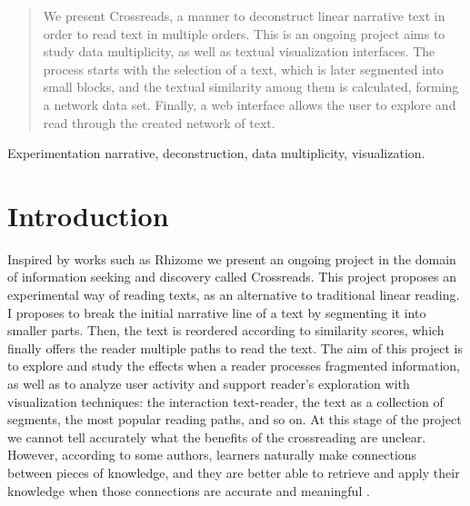 \documentclass{acm_proc_article-sp}
\begin{document}
\date{1st September 2014}

\maketitle
\begin{abstract}
We present Crossreads, a manner to deconstruct linear narrative text in order to read text in multiple orders. This is an ongoing project aims to study data multiplicity, as well as textual visualization interfaces. The
process starts with the selection of a text, which is later segmented into
small blocks, and the textual similarity among them is calculated, forming a network data set. Finally, a web interface allows the user to explore
and read through the created network of text. 
\end{abstract}

\terms Experimentation
\keywords narrative, deconstruction, data multiplicity, visualization.


\section{Introduction}

Inspired by works such as Rhizome \cite{deleuze1987introduction} we
present an ongoing project in the domain of information seeking and
discovery called Crossreads. This project proposes an experimental way
of reading texts, as an alternative to traditional linear reading. I  proposes
to break the initial narrative line of a text by segmenting it
into smaller parts. Then, the text is reordered according to similarity
scores, which finally offers the reader multiple paths to read
the text. The aim of this project is to explore and study the effects
when a reader processes fragmented information, as well as to analyze
user activity and support reader\textquoteright{}s exploration with
visualization techniques: the interaction text-reader, the text as
a collection of segments, the most popular reading paths, and so on.
At this stage of the project we cannot tell accurately what the benefits
of the crossreading are unclear. However, according to some authors, learners naturally
make connections between pieces of knowledge, and they are better
able to retrieve and apply their knowledge when those connections are
accurate and meaningful \cite{ambrose2010learning}.
\end{document}
